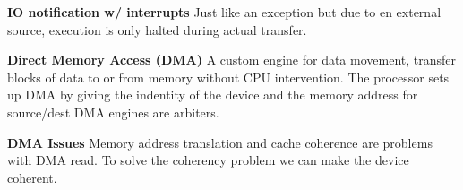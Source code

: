 \textbf{IO notification w/ interrupts} Just like an exception but due to en external
source, execution is only halted during actual transfer.

\textbf{Direct Memory Access (DMA)} A custom engine for data movement, transfer
blocks of data to or from memory without CPU intervention. The processor sets up
DMA by giving the indentity of the device and the memory address for source/dest
DMA engines are arbiters.

\textbf{DMA Issues} Memory address translation and cache coherence are problems
with DMA read. To solve the coherency problem we can make the device coherent.
